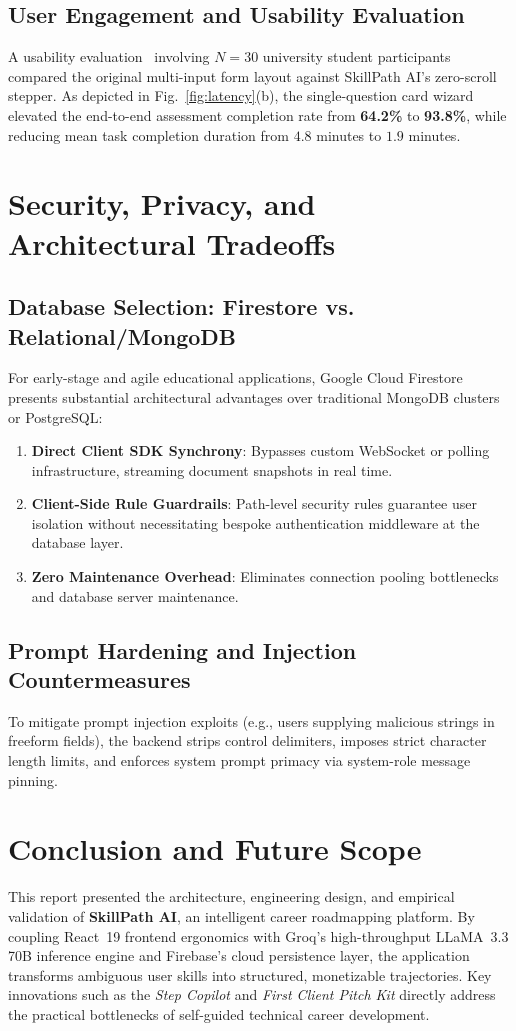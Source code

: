 \documentclass[conference]{IEEEtran}
\begin{document}
\subsection{User Engagement and Usability Evaluation}
A usability evaluation~\cite{nielsen1994usability} involving $N=30$ university student participants compared the original multi-input form layout against SkillPath AI's zero-scroll stepper. As depicted in Fig.~\ref{fig:latency}(b), the single-question card wizard elevated the end-to-end assessment completion rate from \textbf{64.2\%} to \textbf{93.8\%}, while reducing mean task completion duration from $4.8$ minutes to $1.9$ minutes.

\section{Security, Privacy, and Architectural Tradeoffs}
\subsection{Database Selection: Firestore vs. Relational/MongoDB}
For early-stage and agile educational applications, Google Cloud Firestore presents substantial architectural advantages over traditional MongoDB clusters or PostgreSQL:
\begin{enumerate}
    \item \textbf{Direct Client SDK Synchrony}: Bypasses custom WebSocket or polling infrastructure, streaming document snapshots in real time.
    \item \textbf{Client-Side Rule Guardrails}: Path-level security rules guarantee user isolation without necessitating bespoke authentication middleware at the database layer.
    \item \textbf{Zero Maintenance Overhead}: Eliminates connection pooling bottlenecks and database server maintenance.
\end{enumerate}

\subsection{Prompt Hardening and Injection Countermeasures}
To mitigate prompt injection exploits (e.g., users supplying malicious strings in freeform fields), the backend strips control delimiters, imposes strict character length limits, and enforces system prompt primacy via system-role message pinning.

\section{Conclusion and Future Scope}
This report presented the architecture, engineering design, and empirical validation of \textbf{SkillPath AI}, an intelligent career roadmapping platform. By coupling React~19 frontend ergonomics with Groq's high-throughput LLaMA~3.3 70B inference engine and Firebase's cloud persistence layer, the application transforms ambiguous user skills into structured, monetizable trajectories. Key innovations such as the \textit{Step Copilot} and \textit{First Client Pitch Kit} directly address the practical bottlenecks of self-guided technical career development.
\end{document}

